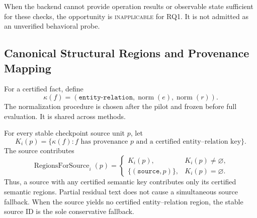 When the backend cannot provide operation results or observable state
sufficient for these checks, the opportunity is \textsc{inapplicable} for
RQ1. It is not admitted as an unverified behavioral probe.

\subsection{Canonical Structural Regions and Provenance Mapping}
\label{app:region-mapping}

For a certified fact, define
\[
\kappa(f)=(\texttt{entity-relation},
\operatorname{norm}(e),\operatorname{norm}(r)).
\]
The normalization procedure is chosen after the pilot and frozen before full
evaluation. It is shared across methods.

For every stable checkpoint source unit \(p\), let
\[
K_i(p)=\{\kappa(f):f\text{ has provenance }p
\text{ and a certified entity--relation key}\}.
\]
The source contributes
\[
\operatorname{RegionsForSource}_i(p)=
\begin{cases}
K_i(p), & K_i(p)\neq\varnothing,\\
\{(\texttt{source},p)\}, & K_i(p)=\varnothing.
\end{cases}
\]
Thus, a source with any certified semantic key contributes only its certified
semantic regions. Partial residual text does not cause a simultaneous source
fallback. When the source yields no certified entity--relation region, the
stable source ID is the sole conservative fallback.

